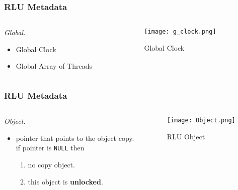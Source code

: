 \documentclass{beamer}
\begin{document}
\begin{frame}[t]
  \frametitle{RLU Metadata}
  \begin{columns}
    \begin{column}{.5\textwidth}
      \emph{Global.}
      \begin{itemize}
      \item Global Clock
      \item Global Array of Threads
      \end{itemize}
    \end{column}

    \begin{column}{.5\textwidth}
      \begin{figure}[ht]
        \centering
        \texttt{[image: g\_clock.png]}
        \caption{Global Clock}
      \end{figure}
    \end{column}
  \end{columns}
  
\end{frame}


\begin{frame}[t]
  \frametitle{RLU Metadata}

  \begin{columns}
    \begin{column}{.5\textwidth}
      \emph{Object.}
      \begin{itemize}
      \item pointer that points to the object copy.\\
        if pointer is \texttt{NULL} then
        \begin{enumerate}
        \item no copy object.
        \item this object is \textbf{unlocked}.
        \end{enumerate}
      \end{itemize}
    \end{column}

    \begin{column}{.5\textwidth}
      \begin{figure}[ht]
        \centering
        \texttt{[image: Object.png]}
        \caption{RLU Object}
      \end{figure}
    \end{column}
  \end{columns}
  
\end{frame}
\end{document}

